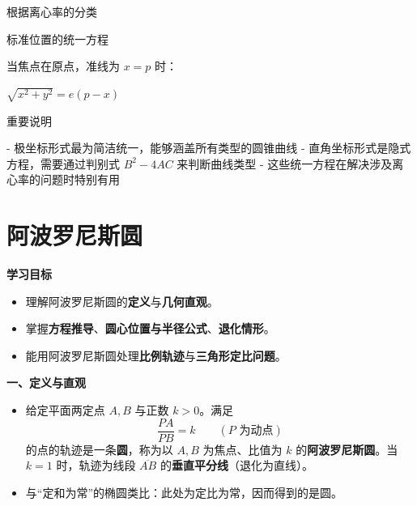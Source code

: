 \documentclass{article}
\begin{document}
    根据离心率的分类
   
%   
%   
   
   标准位置的统一方程
   
   当焦点在原点，准线为 $x = p$ 时：
   
  
  $ \sqrt{x^2 + y^2} = e(p - x)$
   
   
    重要说明
   
   - 极坐标形式最为简洁统一，能够涵盖所有类型的圆锥曲线
   - 直角坐标形式是隐式方程，需要通过判别式 $B^2 - 4AC$ 来判断曲线类型
   - 这些统一方程在解决涉及离心率的问题时特别有用
   

   
   \section{阿波罗尼斯圆}
   
   \textbf{学习目标}
   \begin{itemize}
   	\item 理解阿波罗尼斯圆的\textbf{定义}与\textbf{几何直观}。
   	\item 掌握\textbf{方程推导}、\textbf{圆心位置与半径公式}、\textbf{退化情形}。
   	\item 能用阿波罗尼斯圆处理\textbf{比例轨迹}与\textbf{三角形定比问题}。
   \end{itemize}
   
   \textbf{一、定义与直观}
   \begin{itemize}
   	\item 给定平面两定点 \(A,B\) 与正数 \(k>0\)。满足
   	\[
   	\frac{PA}{PB}=k \qquad (P \text{ 为动点})
   	\]
   	的点的轨迹是一条\textbf{圆}，称为以 \(A,B\) 为焦点、比值为 \(k\) 的\textbf{阿波罗尼斯圆}。当 \(k=1\) 时，轨迹为线段 \(\overline{AB}\) 的\textbf{垂直平分线}（退化为直线）。
   	\item 与“定和为常”的椭圆类比：此处为\(\textbf{定比为常}\)，因而得到的是圆。
   \end{itemize}
   
\end{document}
